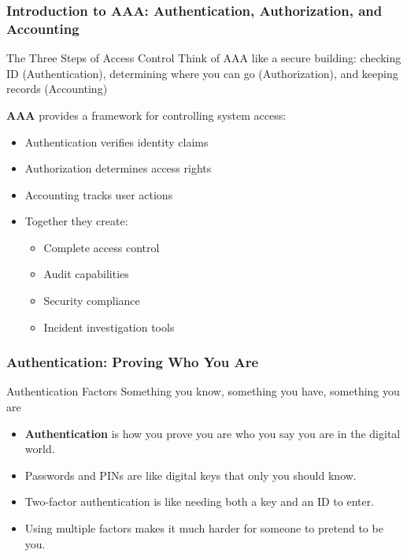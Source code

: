 \documentclass{beamer}
\begin{document}
\begin{frame}
    \frametitle{Introduction to AAA: Authentication, Authorization, and Accounting}
    \begin{block}{The Three Steps of Access Control}
        Think of AAA like a secure building: checking ID (Authentication), determining where you can go (Authorization), and keeping records (Accounting)
    \end{block}
    
    \textbf{AAA} provides a framework for controlling system access:
    \begin{itemize}
        \item Authentication verifies identity claims
        \item Authorization determines access rights
        \item Accounting tracks user actions
        \item Together they create:
          \begin{itemize}
            \item Complete access control
            \item Audit capabilities
            \item Security compliance
            \item Incident investigation tools
          \end{itemize}
    \end{itemize}
\end{frame}

\begin{frame}
    \frametitle{Authentication: Proving Who You Are}
    \begin{block}{Authentication Factors}
        Something you know, something you have, something you are
    \end{block}
    \begin{itemize}
        \item \textbf{Authentication} is how you prove you are who you say you are in the digital world.
        \item Passwords and PINs are like digital keys that only you should know.
        \item Two-factor authentication is like needing both a key and an ID to enter.
        \item Using multiple factors makes it much harder for someone to pretend to be you.
    \end{itemize}
\end{frame}
\end{document}
